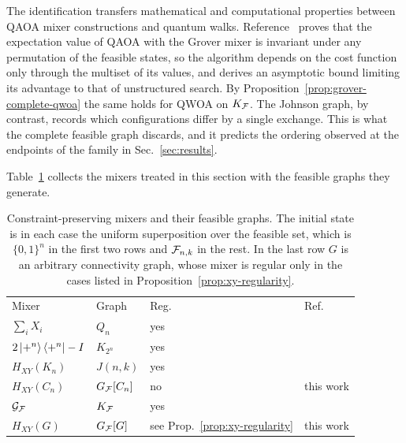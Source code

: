 The identification transfers mathematical and computational properties
between QAOA mixer constructions and quantum walks.
Reference~\cite{Bridi2024} proves that the expectation value of QAOA
with the Grover mixer is invariant under any permutation of the feasible
states, so the algorithm depends on the cost function only through the
multiset of its values, and derives an asymptotic bound limiting its advantage
to that of unstructured search. By
Proposition~\ref{prop:grover-complete-qwoa} the same holds for QWOA on
$K_{\mathcal{F}}$. The Johnson graph, by contrast, records which configurations differ
by a single exchange. This is what the complete feasible graph discards, and
it predicts the ordering observed at the endpoints of the family in
Sec.~\ref{sec:results}.

Table~\ref{tab:mixer-graph} collects the mixers treated in this section with
the feasible graphs they generate.

\begin{table}[t]
\caption{\label{tab:mixer-graph}Constraint-preserving mixers and their
feasible graphs. The initial state is in each case the uniform superposition
over the feasible set, which is $\{0,1\}^n$ in the first two rows and
$\mathcal{F}_{n,k}$ in the rest. In the last row $G$ is an arbitrary connectivity
graph, whose mixer is regular only in the cases listed in
Proposition~\ref{prop:xy-regularity}.}
\begin{ruledtabular}
\setlength{\tabcolsep}{3pt}
\begin{tabular}{llll}
Mixer & Graph & Reg. & Ref. \\
\colrule
$\sum_i X_i$ & $Q_n$ & yes & \cite{Farhi2014,Marsh2019} \\
$2\ket{+^n}\bra{+^n}-I$ & $K_{2^n}$ & yes & \cite{Bartschi2020} \\
$H_{XY}(K_n)$ & $J(n,k)$ & yes & \cite{Wang2020,Matwiejew2024} \\
$H_{XY}(C_n)$ & $G_{\mathcal{F}}[C_n]$ & no & this work \\
$\mathcal{G}_{\mathcal{F}}$ & $K_{\mathcal{F}}$ & yes & \cite{Bartschi2020,Slate2021} \\
$H_{XY}(G)$ & $G_{\mathcal{F}}[G]$ & see Prop.~\ref{prop:xy-regularity} & this work \\
\end{tabular}
\end{ruledtabular}
\end{table}